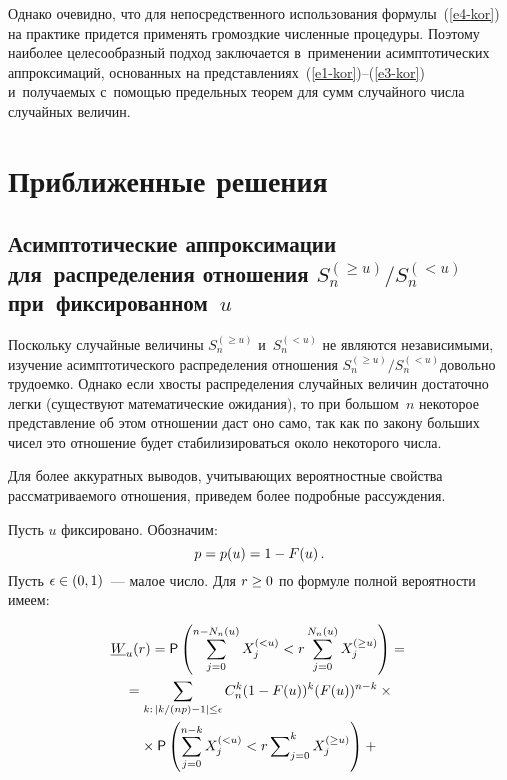 \begin{multicols}{2}
Однако очевидно, что для непосредственного использования формулы~(\ref{e4-kor})
на практике придется применять громоздкие численные процедуры.\linebreak
Поэтому наиболее целесообразный подход заключается в~применении
асимптотических аппроксимаций, основанных на 
представлениях~(\ref{e1-kor})--(\ref{e3-kor}) и~получаемых с~помощью 
предельных теорем для сумм случайного числа случайных величин.

\section{Приближенные решения}


\subsection{Асимптотические аппроксимации для~распределения
от\-но\-ше\-ния $S_n^{(\ge u)}/S_n^{(< u)}$ при~фиксированном~$u$}

Поскольку случайные величины $S_n^{(\ge u)}$ и~$S_n^{(< u)}$ не
являются независимыми, изучение асимптотического распределения
отношения $S_n^{(\ge u)}/S_n^{(< u)}$\linebreak довольно трудоемко. Однако
если хвосты распределения случайных величин достаточно легки
(существуют математические ожидания), то при боль\-шом~$n$ некоторое
представление об этом отношении даст оно само, так как по закону
больших чисел это отношение будет стабилизироваться около некоторого
числа.

Для более аккуратных выводов, учитывающих вероятностные
 свойства рассматриваемого отношения, приведем более 
 подробные рассуждения.

Пусть $u$ фиксировано. Обозначим: 
$$
p\hm=p(u)\hm=1\hm-F(u)\,.
$$
Пусть $\epsilon\hm\in(0,1)$~--- малое число. Для $r\hm\ge 0$ по 
формуле полной вероятности имеем:

\noindent
\begin{multline*}
\underline{W}_u(r)={\sf P}\left(\sum\limits_{j=0}^{n-N_n(u)}
X_j^{(<u)}<r\sum\limits_{j=0}^{N_n(u)}X_j^{(\ge u)}\right)={}
\\
{}=\sum\limits_{k:\,\left\vert {k}/({np})-1\right\vert \le\epsilon}
C_n^k(1-F(u))^k(F(u))^{n-k}
\times{}\\
{}\times {\sf P}\left(
\sum\limits_{j=0}^{n-k}X_j^{(<u)}<r\sum\nolimits_{j=0}^{k}X_j^{(\ge u)}\right)+{}
\end{multline*}


\end{multicols}
